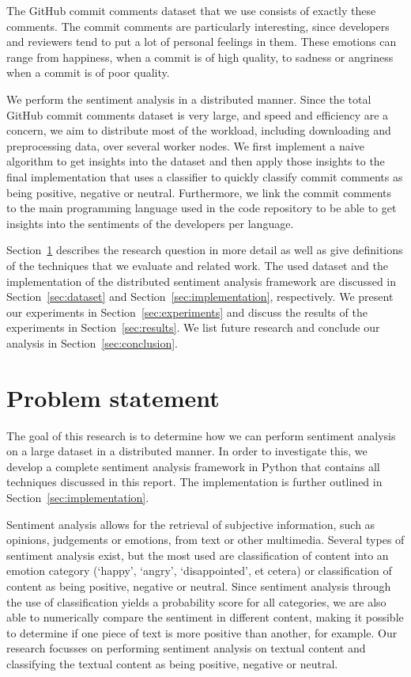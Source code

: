 \documentclass{article}
\begin{document}
The GitHub commit comments dataset that we use consists of exactly these 
comments. The commit comments are particularly interesting, since developers 
and reviewers tend to put a lot of personal feelings in them. These emotions 
can range from happiness, when a commit is of high quality, to sadness or 
angriness when a commit is of poor quality.

We perform the sentiment analysis in a distributed manner. Since the total 
GitHub commit comments dataset is very large, and speed and efficiency are 
a concern, we aim to distribute most of the workload, including downloading and 
preprocessing data, over several worker nodes. We first implement a naive 
algorithm to get insights into the dataset and then apply those insights to the 
final implementation that uses a classifier to quickly classify commit comments 
as being positive, negative or neutral. Furthermore, we link the commit 
comments to the main programming language used in the code repository to be 
able to get insights into the sentiments of the developers per language.

Section~\ref{sec:problem} describes the research question in more detail as well
as give definitions of the techniques that we evaluate and related work. The
used dataset and the implementation of the distributed sentiment analysis
framework are discussed in Section~\ref{sec:dataset} and
Section~\ref{sec:implementation}, respectively. We present our experiments in
Section~\ref{sec:experiments} and discuss the results of the experiments in
Section~\ref{sec:results}. We list future research and conclude our analysis in
Section~\ref{sec:conclusion}.

\section{Problem statement}\label{sec:problem}
The goal of this research is to determine how we can perform sentiment analysis
on a large dataset in a distributed manner. In order to investigate this, we
develop a complete sentiment analysis framework in Python that contains all
techniques discussed in this report. The implementation is further outlined in 
Section~\ref{sec:implementation}.

Sentiment analysis allows for the retrieval of subjective information, such as
opinions, judgements or emotions, from text or other multimedia. Several types
of sentiment analysis exist, but the most used are classification of content
into an emotion category (`happy', `angry', `disappointed', et cetera) or
classification of content as being positive, negative or neutral. Since
sentiment analysis through the use of classification yields a probability score
for all categories, we are also able to numerically compare the sentiment in
different content, making it possible to determine if one piece of text is more
positive than another, for example. Our research focusses on performing 
sentiment analysis on textual content and classifying the textual content as 
being positive, negative or neutral.
\end{document}
